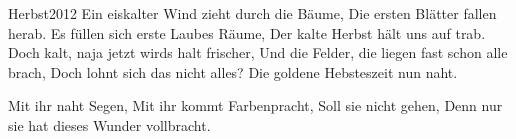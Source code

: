 \begin{poem}[][ornaspadeflowers]{Herbst}{2012}
Ein eiskalter Wind zieht durch die Bäume,
Die ersten Blätter fallen herab.
Es füllen sich erste Laubes Räume,
Der kalte Herbst hält uns auf trab.
Doch kalt, naja jetzt wirds halt frischer,
Und die Felder, die liegen fast schon alle brach,
Doch lohnt sich das nicht alles? Die goldene Hebsteszeit nun naht.

Mit ihr naht Segen,
Mit ihr kommt Farbenpracht,
Soll sie nicht gehen,
Denn nur sie hat dieses Wunder vollbracht.
\end{poem}